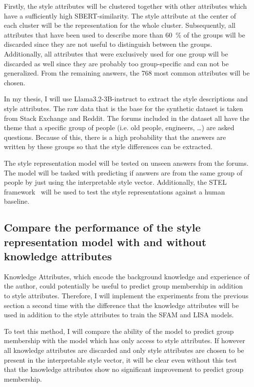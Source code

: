 Firstly, the style attributes will be clustered together with other attributes which have a sufficiently high SBERT-similarity. The style attribute at the center of each cluster will be the representation for the whole cluster. Subsequently, all attributes that have been used to describe more than \SI{60}{\percent} of the groups will be discarded since they are not useful to distinguish between the groups. Additionally, all attributes that were exclusively used for one group will be discarded as well since they are probably too group-specific and can not be generalized. From the remaining answers, the 768 most common attributes will be chosen.

In my thesis, I will use Llama3.2-3B-instruct %
to extract the style descriptions and style attributes. The raw data that is the base for the synthetic dataset is taken from Stack Exchange and Reddit. The forums included in the dataset all have the theme that a specific group of people (i.e. old people, engineers, \ldots) are asked questions. Because of this, there is a high probability that the answers are written by these groups so that the style differences can be extracted.

The style representation model will be tested on unseen answers from the forums. The model will be tasked with predicting if answers are from the same group of people by just using the interpretable style vector. Additionally, the STEL framework~\cite{wegmann-nguyen-2021-capture} will be used to test the style representations against a human baseline.


\subsection{Compare the performance of the style representation model with and without knowledge attributes}
Knowledge Attributes, which encode the background knowledge and experience of the author, could potentially be useful to predict group membership in addition to style attributes. Therefore, I will implement the experiments from the previous section a second time with the difference that the knowledge attributes will be used in addition to the style attributes to train the SFAM and LISA models.

To test this method, I will compare the ability of the model to predict group membership with the model which has only access to style attributes. If however all knowledge attributes are discarded and only style attributes are chosen to be present in the interpretable style vector, it will be clear even without this test that the knowledge attributes show no significant improvement to predict group membership.


